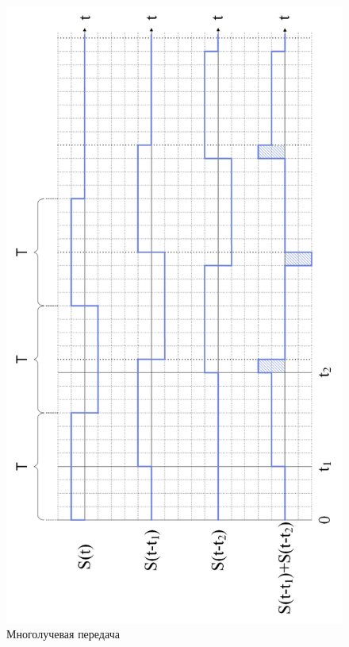 \begin{figure}[h]
	\centering
	\includegraphics[width=0.59\linewidth]{AfanasyevMM/img/time_scheme}
	\caption{Многолучевая передача}
	\label{fig:AfanasyevMM.time_scheme}
\end{figure}